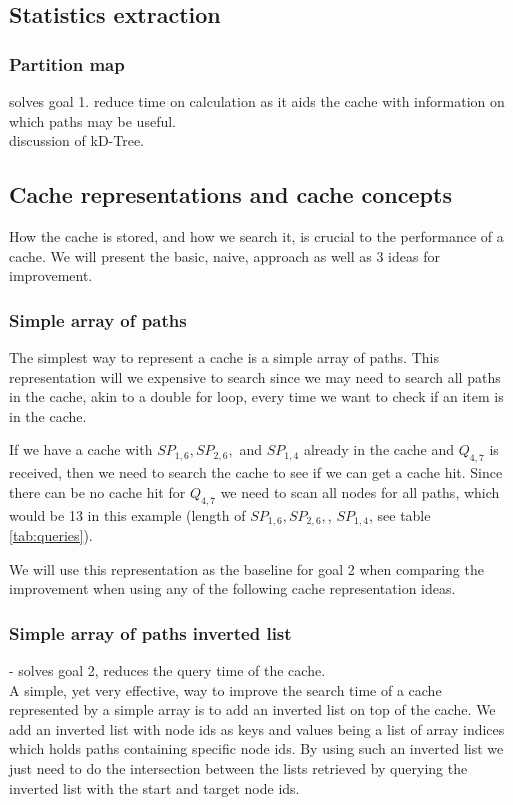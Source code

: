 \subsection{Statistics extraction}

%


\subsubsection{Partition map} 
solves goal 1. reduce time on \spath calculation as it aids the cache with information on which paths may be useful.\\ 
discussion of kD-Tree.


\subsection{Cache representations and cache concepts} \label{subsec:cacherepresentatons}
How the cache is stored, and how we search it, is crucial to the performance of a cache. We will present the basic, naive, approach as well as 3 ideas for improvement.
% 
\subsubsection{Simple array of paths}%
The simplest way to represent a cache is a simple array of paths. This representation will we expensive to search since we may need to search all paths in the cache, akin to a double for loop, every time we want to check if an item is in the cache.

If we have a cache with $SP_{1,6},SP_{2,6},$ and $SP_{1,4}$ already in the cache and $Q_{4,7}$ is received, then we need to search the cache to see if we can get a cache hit. Since there can be no cache hit for $Q_{4,7}$ we need to scan all nodes for all paths, which would be 13 in this example (length of $SP_{1,6},SP_{2,6},$, $SP_{1,4}$, see table \ref{tab:queries}).

We will use this representation as the baseline for goal 2 when comparing the improvement when using any of the following cache representation ideas.

\subsubsection{Simple array of paths inverted list} - solves goal 2, reduces the query time of the cache.\\
A simple, yet very effective, way to improve the search time of a cache represented by a simple array is to add an inverted list on top of the cache. We add an inverted list with node ids as keys and values being a list of array indices which holds paths containing specific node ids. By using such an inverted list we just need to do the intersection between the lists retrieved by querying the inverted list with the start and target node ids. 


